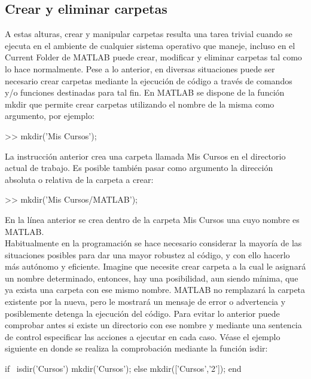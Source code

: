 \subsection{Crear y eliminar carpetas}

A estas alturas, crear y manipular carpetas resulta una tarea trivial
cuando se ejecuta en el ambiente de cualquier sistema operativo que
maneje, incluso en el Current Folder de MATLAB puede crear, modificar y
eliminar carpetas tal como lo hace normalmente. Pese a lo anterior, en
diversas situaciones puede ser necesario crear carpetas mediante la
ejecución de código a través de comandos y/o funciones destinadas para
tal fin. En MATLAB se dispone de la función mkdir que permite crear
carpetas utilizando el nombre de la misma como argumento, por ejemplo:

\begin{matlab}
>> mkdir('Mis Cursos');
\end{matlab}

La instrucción anterior crea una carpeta llamada Mis Cursos en el
directorio actual de trabajo. Es posible también pasar como argumento la
dirección absoluta o relativa de la carpeta a crear:

\begin{matlab}
>> mkdir('Mis Cursos/MATLAB');
\end{matlab}

En la línea anterior se crea dentro de la carpeta Mis Cursos una cuyo
nombre es MATLAB. \\

Habitualmente en la programación se hace necesario considerar la mayoría
de las situaciones posibles para dar una mayor robustez al código, y con
ello hacerlo más autónomo y eficiente. Imagine que necesite crear
carpeta a la cual le asignará un nombre determinado, entonces, hay una
posibilidad, aun siendo mínima, que ya exista una carpeta con ese mismo
nombre. MATLAB no remplazará la carpeta existente por la nueva, pero le
mostrará un mensaje de error o advertencia y posiblemente detenga la
ejecución del código. Para evitar lo anterior puede comprobar antes si
existe un directorio con ese nombre y mediante una sentencia de control
especificar las acciones a ejecutar en cada caso. Véase el ejemplo
siguiente en donde se realiza la comprobación mediante la función isdir:

\begin{matlab}
if ~isdir('Cursos')
    mkdir('Cursos');
else
    mkdir(['Cursos','2']);
end
\end{matlab}

